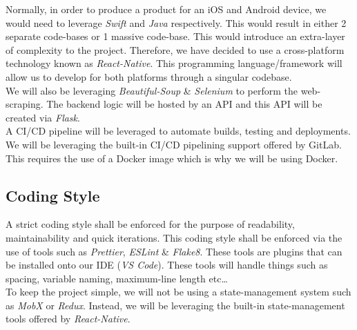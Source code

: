 \documentclass[11pt, oneside]{article}   	%
\begin{document}
Normally, in order to produce a product for an iOS and Android device, we would need to leverage {\it Swift} and {\it Java} respectively. This would result in either 2 separate code-bases or 1 massive code-base. This would introduce an extra-layer of complexity to the project. Therefore, we have decided to use a cross-platform technology known as {\it React-Native}. This programming language/framework will allow us to develop for both platforms through a singular codebase. \\

We will also be leveraging {\it Beautiful-Soup} \& {\it Selenium} to perform the web-scraping. The backend logic will be hosted by an API and this API will be created via {\it Flask}. \\

A CI/CD pipeline will be leveraged to automate builds, testing and deployments. We will be leveraging the built-in CI/CD pipelining support offered by GitLab. This requires the use of a Docker image which is why we will be using Docker. \\

\newpage
\subsection*{Coding Style}

A strict coding style shall be enforced for the purpose of readability, maintainability and quick iterations. This coding style shall be enforced via the use of tools such as {\it Prettier}, {\it ESLint} \& {\it Flake8}. These tools are plugins that can be installed onto our IDE ({\it VS Code}). These tools will handle things such as spacing, variable naming, maximum-line length etc…\\

To keep the project simple, we will not be using a state-management system such as {\it MobX} or {\it Redux}. Instead, we will be leveraging the built-in state-management tools offered by {\it React-Native}.
\end{document}
